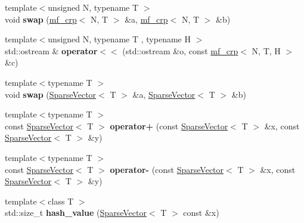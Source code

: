 \begin{DoxyCompactItemize}
{\footnotesize template$<$unsigned N, typename T $>$ }\\void {\bfseries swap} (\mbox{\hyperlink{classcpyp_1_1mf__crp}{mf\+\_\+crp}}$<$ N, T $>$ \&a, \mbox{\hyperlink{classcpyp_1_1mf__crp}{mf\+\_\+crp}}$<$ N, T $>$ \&b)
\item 
\mbox{\label{namespacecpyp_a825198fe47415232c07edb5bbafedfa4}} 
{\footnotesize template$<$unsigned N, typename T , typename H $>$ }\\std\+::ostream \& {\bfseries operator$<$$<$} (std\+::ostream \&o, const \mbox{\hyperlink{classcpyp_1_1mf__crp}{mf\+\_\+crp}}$<$ N, T, H $>$ \&c)
\item 
\mbox{\label{namespacecpyp_a2eef00da4206e29b95fa9a2b27802690}} 
{\footnotesize template$<$typename T $>$ }\\void {\bfseries swap} (\mbox{\hyperlink{classcpyp_1_1_sparse_vector}{Sparse\+Vector}}$<$ T $>$ \&a, \mbox{\hyperlink{classcpyp_1_1_sparse_vector}{Sparse\+Vector}}$<$ T $>$ \&b)
\item 
\mbox{\label{namespacecpyp_a059580efed9eeb20e0245db82bbbc7aa}} 
{\footnotesize template$<$typename T $>$ }\\const \mbox{\hyperlink{classcpyp_1_1_sparse_vector}{Sparse\+Vector}}$<$ T $>$ {\bfseries operator+} (const \mbox{\hyperlink{classcpyp_1_1_sparse_vector}{Sparse\+Vector}}$<$ T $>$ \&x, const \mbox{\hyperlink{classcpyp_1_1_sparse_vector}{Sparse\+Vector}}$<$ T $>$ \&y)
\item 
\mbox{\label{namespacecpyp_a07400ec9132a682ec56970f82b927ecf}} 
{\footnotesize template$<$typename T $>$ }\\const \mbox{\hyperlink{classcpyp_1_1_sparse_vector}{Sparse\+Vector}}$<$ T $>$ {\bfseries operator-\/} (const \mbox{\hyperlink{classcpyp_1_1_sparse_vector}{Sparse\+Vector}}$<$ T $>$ \&x, const \mbox{\hyperlink{classcpyp_1_1_sparse_vector}{Sparse\+Vector}}$<$ T $>$ \&y)
\item 
\mbox{\label{namespacecpyp_a5bd708374f2dba28ca360b8db74d684a}} 
{\footnotesize template$<$class T $>$ }\\std\+::size\+\_\+t {\bfseries hash\+\_\+value} (\mbox{\hyperlink{classcpyp_1_1_sparse_vector}{Sparse\+Vector}}$<$ T $>$ const \&x)
\item 
\mbox{\label{namespacecpyp_a98ebba407b06011044e0a851d7bceb83}} 

\end{DoxyCompactItemize}
